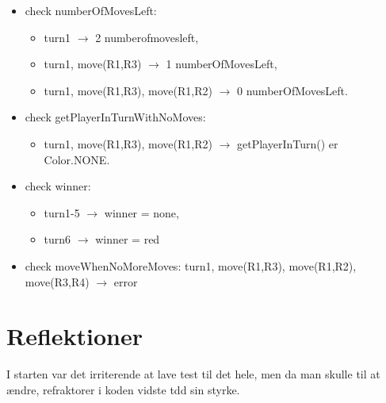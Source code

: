\documentclass[a4paper]{article}
\begin{document}
\begin{itemize}
\item check numberOfMovesLeft: 
  \begin{itemize}
  \item turn1 $\rightarrow$ 2 numberofmovesleft,

  \item turn1, move(R1,R3) $\rightarrow$ 1 numberOfMovesLeft,

  \item turn1, move(R1,R3), move(R1,R2) $\rightarrow$ 0 numberOfMovesLeft.

  \end{itemize}


\item check getPlayerInTurnWithNoMoves: 
  \begin{itemize}
  \item turn1, move(R1,R3), move(R1,R2) $\rightarrow$ getPlayerInTurn() er Color.NONE.

  \end{itemize}
\item check winner:
  \begin{itemize}
  \item  turn1-5 $\rightarrow$ winner = none,

  \item turn6 $\rightarrow$ winner = red
  \end{itemize}


\item check moveWhenNoMoreMoves: turn1, move(R1,R3), move(R1,R2), move(R3,R4) $\rightarrow$ error


\end{itemize}

\section{Reflektioner}

I starten var det irriterende at lave test til det hele, men da man
skulle til at \ae ndre, refraktorer i koden vidste tdd sin styrke.
\end{document}
